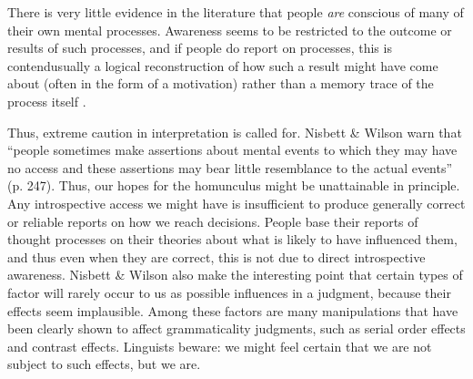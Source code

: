 \enlargethispage{\baselineskip}
There is very little evidence in the literature that people \textit{are} conscious of many of their own mental processes. Awareness seems to be restricted to the outcome or results of such processes, and if people do report on processes, this is\schdash{}\citet{NisbettEtAl1977} contend\schdash{}usually a logical reconstruction of how such a result might have come about (often in the form of a motivation) rather than a memory trace of the process itself  \citep[7]{LeveltEtAl1978}.

Thus, extreme caution in interpretation is called for. Nisbett \& Wilson warn that ``people sometimes make assertions about mental events to which they may have no access and these assertions may bear little resemblance to the actual events'' (p. 247). Thus, our hopes for the homunculus might be unattainable in principle. Any introspective access we might have is insufficient to produce generally correct or reliable reports on how we reach decisions. People base their reports of thought processes on their theories about what is likely to have influenced them, and thus even when they are correct, this is not due to direct introspective awareness. Nisbett \& Wilson also make the interesting point that certain types of factor will  rarely occur to us as possible influences in a judgment, because their effects seem implausible. Among these factors are many manipulations that have been clearly shown to affect grammaticality judgments, such as serial order effects and contrast effects. Linguists beware: we might feel certain that we are not subject to such effects, but we are.

